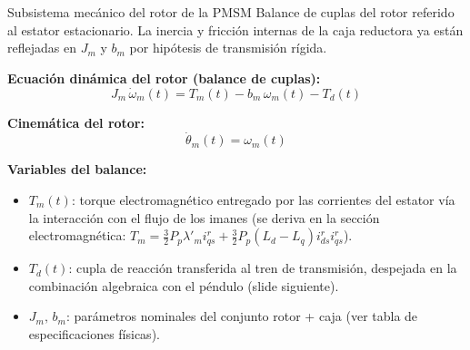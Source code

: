 \documentclass[aspectratio=169,t]{beamer}
\begin{document}
\begin{frame}{Subsistema mecánico del rotor de la PMSM}
{\small\color{uncGray}Balance de cuplas del rotor referido al estator estacionario. La inercia y fricción internas de la caja reductora ya están reflejadas en $J_m$ y $b_m$ por hipótesis de transmisión rígida.}\par
\vspace{4mm}

\textbf{Ecuación dinámica del rotor (balance de cuplas):}
\begin{equation*}
J_m\,\dot{\omega}_m(t) = T_m(t) - b_m\,\omega_m(t) - T_d(t)
\end{equation*}

\textbf{Cinemática del rotor:}
\begin{equation*}
\dot{\theta}_m(t) = \omega_m(t)
\end{equation*}

\textbf{Variables del balance:}
\begin{itemize}
\item $T_m(t)$: torque electromagnético entregado por las corrientes del estator vía la interacción con el flujo de los imanes (se deriva en la sección electromagnética: $T_m = \tfrac{3}{2}P_p\lambda'_m i_{qs}^r + \tfrac{3}{2}P_p(L_d-L_q)i_{ds}^r i_{qs}^r$).
\item $T_d(t)$: cupla de reacción transferida al tren de transmisión, despejada en la combinación algebraica con el péndulo (slide siguiente).
\item $J_m,\,b_m$: parámetros nominales del conjunto rotor + caja (ver tabla de especificaciones físicas).
\end{itemize}
\end{frame}
\end{document}
